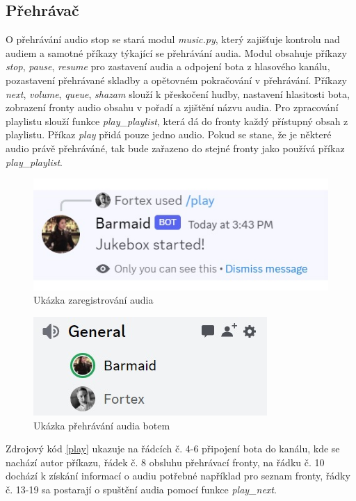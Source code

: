 \documentclass[
  program=inf,
biblatex=false,
sourcecodes=true,
joinlists=true,
  figures=true,
  tables=true,
  glossaries=true,
  index=false
]{kidiplom}
\begin{document}
\newpage
\subsection{Přehrávač}
O přehrávání audio stop se stará modul {\it music.py}, který zajišťuje kontrolu nad audiem a
samotné příkazy týkající se přehrávání audia. Modul obsahuje příkazy {\it stop}, {\it pause},
{\it resume} pro zastavení audia a odpojení bota z hlasového kanálu, pozastavení přehrávané skladby a 
opětovném pokračování v přehrávání. Příkazy {\it next}, {\it volume}, {\it queue}, {\it shazam}
slouží k přeskočení hudby, nastavení hlasitosti bota, zobrazení fronty audio obsahu v pořadí a zjištění
názvu audia. Pro zpracování playlistu slouží funkce {\it play\_playlist}, která dá do fronty
každý přístupný obsah z playlistu. Příkaz {\it play} přidá pouze jedno audio. Pokud se stane, že 
je některé audio právě přehráváné, tak bude zařazeno do stejné fronty jako používá příkaz {\it play\_playlist}.

\begin{figure}[h!]
  \centering \includegraphics[scale=0.99]{jukebox_play}
  \caption{\label{jukebox_play}Ukázka zaregistrování audia}
\end{figure}

\begin{figure}[h!]
  \centering \includegraphics[scale=1.2]{audio_playing}
  \caption{\label{audio_playing}Ukázka přehrávání audia botem}
\end{figure}

\newpage
Zdrojový kód \ref{play} ukazuje na řádcích č. 4-6 připojení bota do kanálu, kde se nachází autor příkazu,
řádek č. 8 obsluhu přehrávací fronty, na řádku č. 10 dochází k získání informací o audiu potřebné
například pro seznam fronty, řádky č. 13-19 sa postarají o spuštění audia pomocí funkce {\it play\_next}.
\end{document}
